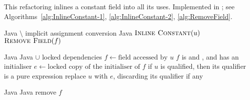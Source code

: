 \subsection{}
This refactoring inlines a constant field into all its uses. Implemented in ; see Algorithms~\ref{alg:InlineConstant-1}, \ref{alg:InlineConstant-2}, \ref{alg:RemoveField}.

\begin{algorithm}
\caption{$\refactoring{Inline Constant}(f : \type{Field})$}
\label{alg:InlineConstant-1}
\begin{algorithmic}[1]
\REQUIRE Java $\setminus$ implicit assignment conversion
\ENSURE Java
\medskip
{}
  \STATE $\textsc{Inline Constant}(u)$
\ENDFOR
\STATE $\textsc{Remove Field}(f)$
\end{algorithmic}
\end{algorithm}

\begin{algorithm}
\caption{$\refactoring{Inline Constant}(u : \type{FieldAccess})$}
\label{alg:InlineConstant-2}
\begin{algorithmic}[1]
\REQUIRE Java
\ENSURE Java $\cup$ locked dependencies
\medskip
\STATE $f \leftarrow \text{field accessed by $u$}$
\STATE \assert $f$ is  and , and has an initialiser
\STATE $e \leftarrow \text{locked copy of the initialiser of $f$}$
\STATE \assert if $u$ is qualified, then its qualifier is a pure expression
\STATE replace $u$ with $e$, discarding its qualifier if any
\end{algorithmic}
\end{algorithm}

\begin{algorithm}
\caption{$\refactoring{Remove Field}(f : \type{Field})$}
\label{alg:RemoveField}
\begin{algorithmic}[1]
\REQUIRE Java
\ENSURE Java
\medskip
{}
  \STATE remove $f$
\ENDIF
\end{algorithmic}
\end{algorithm}
